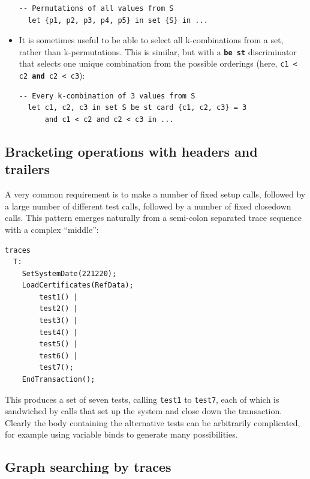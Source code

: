 \documentclass{overturerepchap}
\begin{document}
\begin{itemize}
\begin{lstlisting}
-- Permutations of all values from S
  let {p1, p2, p3, p4, p5} in set {S} in ...
\end{lstlisting}
\normalsize
  \item It is sometimes useful to be able to select all k-combinations from
  a set, rather than k-permutations. This is similar, but with a \texttt{\textbf{be
  st}} discriminator that selects one unique combination from the possible orderings
  (here, \texttt{c1 < c2 \textbf{and} c2 < c3}):
\small
\begin{lstlisting}
-- Every k-combination of 3 values from S
  let c1, c2, c3 in set S be st card {c1, c2, c3} = 3
      and c1 < c2 and c2 < c3 in ...
\end{lstlisting}
\normalsize
\end{itemize}

\subsection{Bracketing operations with headers and trailers}

A very common requirement is to make a number of fixed setup calls,
followed by a large number of different test calls, followed by a number of
fixed closedown calls. This pattern emerges naturally from a semi-colon
separated trace sequence with a complex ``middle'':
\scriptsize
\begin{lstlisting}
traces
  T:
    SetSystemDate(221220);
    LoadCertificates(RefData);
        test1() |
        test2() |
        test3() |
        test4() |
        test5() |
        test6() |
        test7();
    EndTransaction();
\end{lstlisting}
\normalsize
This produces a set of seven tests, calling \texttt{test1} to \texttt{test7},
each of which is sandwiched by calls that set up the system and close down the
transaction. Clearly the body containing the alternative tests can be
arbitrarily complicated, for example using variable binds to generate many
possibilities.

\subsection{Graph searching by traces}
\end{document}
